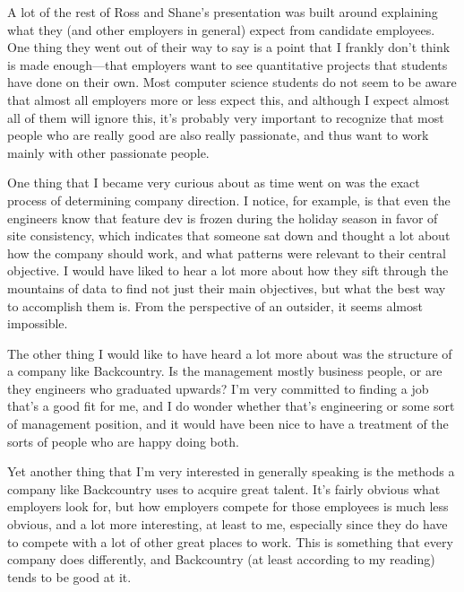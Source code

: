 \documentclass[a4paper]{article}
\begin{document}
A lot of the rest of Ross and Shane's presentation was built around explaining what they (and other employers in general) expect from candidate employees. One thing they went out of their way to say is a point that I frankly don't think is made enough---that employers want to see quantitative projects that students have done on their own. Most computer science students do not seem to be aware that almost all employers more or less expect this, and although I expect almost all of them will ignore this, it's probably very important to recognize that most people who are really good are also really passionate, and thus want to work mainly with other passionate people.

One thing that I became very curious about as time went on was the exact process of determining company direction. I notice, for example, is that even the engineers know that feature dev is frozen during the holiday season in favor of site consistency, which indicates that someone sat down and thought a lot about how the company should work, and what patterns were relevant to their central objective. I would have liked to hear a lot more about how they sift through the mountains of data to find not just their main objectives, but what the best way to accomplish them is. From the perspective of an outsider, it seems almost impossible.

The other thing I would like to have heard a lot more about was the structure of a company like Backcountry. Is the management mostly business people, or are they engineers who graduated upwards? I'm very committed to finding a job that's a good fit for me, and I do wonder whether that's engineering or some sort of management position, and it would have been nice to have a treatment of the sorts of people who are happy doing both.

Yet another thing that I'm very interested in generally speaking is the methods a company like Backcountry uses to acquire great talent. It's fairly obvious what employers look for, but how employers compete for those employees is much less obvious, and a lot more interesting, at least to me, especially since they do have to compete with a lot of other great places to work. This is something that every company does differently, and Backcountry (at least according to my reading) tends to be good at it.
\end{document}
